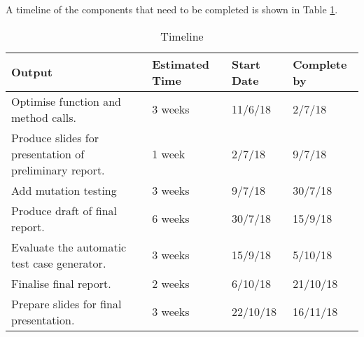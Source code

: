 A timeline of the components that need to be completed is shown in Table \ref{table:timeline}.

\begin{table}[H]
	  \centering
\begin{tabular}{ |p{10cm}|p{2cm}|p{2cm}|p{2cm}| }
\hline
\textbf{Output} & \textbf{Estimated Time} & \textbf{Start Date} & \textbf{Complete by}\\
\hline
Optimise function and method calls. & 3 weeks & 11/6/18 & 2/7/18 \\
\hline
Produce slides for presentation of preliminary report. & 1 week & 2/7/18 & 9/7/18\\
\hline
Add mutation testing & 3 weeks & 9/7/18 & 30/7/18 \\
\hline
Produce draft of final report. & 6 weeks & 30/7/18 & 15/9/18\\
\hline
Evaluate the automatic test case generator. & 3 weeks & 15/9/18 & 5/10/18 \\
\hline
Finalise final report. & 2 weeks & 6/10/18 & 21/10/18\\
\hline
Prepare slides for final presentation. & 3 weeks & 22/10/18 & 16/11/18\\
\hline
\end{tabular}

\caption{Timeline}
\label{table:timeline}

\end{table}

